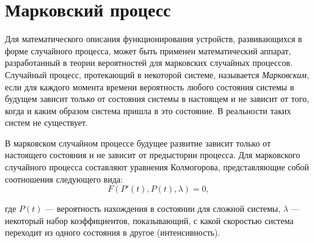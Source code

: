 \chapter{Марковский процесс}

Для математического описания функционирования устройств, развивающихся в форме случайного процесса, может быть применен математический аппарат, разработанный в теории вероятностей для марковских случайных процессов.
Случайный процесс, протекающий в некоторой системе, называется \textit{Марковским}, если для каждого момента времени вероятность любого состояния системы в будущем зависит только от состояния системы в настоящем и не зависит от того, когда и каким образом система пришла в это состояние.
В реальности таких систем не существует.

В марковском случайном процессе будущее развитие зависит только от настоящего состояния и не зависит от предыстории процесса.
Для марковского случайного процесса составляют уравнения Колмогорова, представляющие собой соотношения следующего вида:
\begin{equation}
	F(P'(t), P(t), \lambda) = 0,
\end{equation}

где $P(t)$ --- вероятность нахождения в состоянии для сложной системы,
$\lambda$ --- некоторый набор коэффициентов, показывающий, с какой скоростью система переходит из одного состояния в другое (интенсивность).

